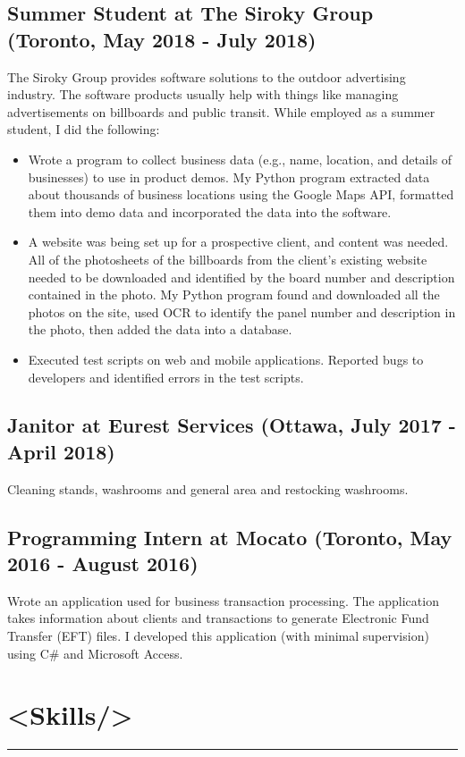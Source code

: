 \documentclass[11pt]{article}
\begin{document}
		\subsection{Summer Student at The Siroky Group (Toronto, May 2018 - July 2018)}
		\noindent The Siroky Group provides software solutions to the outdoor advertising industry. The software products usually help with things like managing advertisements on billboards and public transit. While employed as a summer student, I did the following:
		\begin{itemize}
		\item Wrote a program to collect business data (e.g., name, location, and details of businesses) to use in product demos. My Python program extracted data about thousands of business locations using the Google Maps API, formatted them into demo data and incorporated the data into the software. 
		\item A website was being set up for a prospective client, and content was needed. All of the photosheets of the billboards from the client's existing website needed to be downloaded and identified by the board number and description contained in the photo. My Python program found and downloaded all the photos on the site, used OCR to identify the panel number and description in the photo, then added the data into a database. 
		\item Executed test scripts on web and mobile applications. Reported bugs to developers and identified errors in the test scripts.
		\end{itemize}
		\subsection{Janitor at Eurest Services (Ottawa, July 2017 - April 2018)}
		\noindent Cleaning stands, washrooms and general area and restocking washrooms.
		\subsection{Programming Intern at Mocato (Toronto, May 2016 - August 2016)}
		
		\noindent Wrote an application used for business transaction processing. The application takes information about clients and transactions to generate Electronic Fund Transfer (EFT) files. I developed this application (with minimal supervision) using C\# and Microsoft Access.
		
	
	
	\section{\textless Skills/\textgreater}
	\hrule \hfill %
\end{document}
